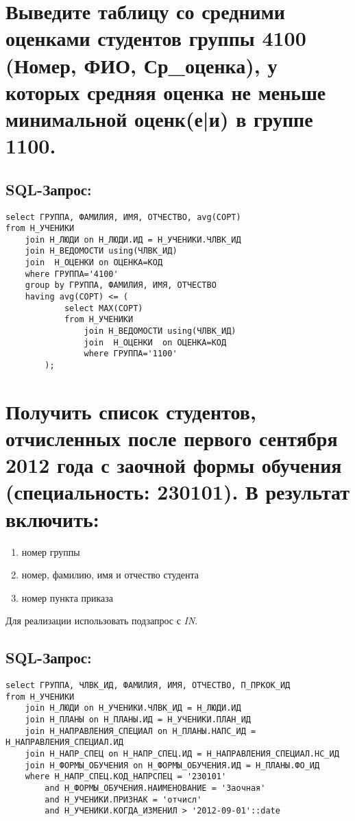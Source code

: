 \newpage
\section{Выведите таблицу со средними оценками студентов группы 4100 (Номер, ФИО, Ср\_оценка), у которых средняя оценка не меньше минимальной оценк(е|и) в группе 1100.}
\subsection{SQL-Запрос:}
\begin{verbatim}
select ГРУППА, ФАМИЛИЯ, ИМЯ, ОТЧЕСТВО, avg(СОРТ)
from Н_УЧЕНИКИ
    join Н_ЛЮДИ on Н_ЛЮДИ.ИД = Н_УЧЕНИКИ.ЧЛВК_ИД
    join Н_ВЕДОМОСТИ using(ЧЛВК_ИД)
    join  Н_ОЦЕНКИ on ОЦЕНКА=КОД
    where ГРУППА='4100'
    group by ГРУППА, ФАМИЛИЯ, ИМЯ, ОТЧЕСТВО
    having avg(СОРТ) <= (
            select MAX(СОРТ)
            from Н_УЧЕНИКИ
                join Н_ВЕДОМОСТИ using(ЧЛВК_ИД)
                join  Н_ОЦЕНКИ  on ОЦЕНКА=КОД
                where ГРУППА='1100'
        );
\end{verbatim}

\newpage
\section{Получить список студентов, отчисленных после первого сентября 2012 года с заочной формы обучения (специальность: 230101). В результат включить:}
\begin{enumerate}
	\item номер группы
	\item номер, фамилию, имя и отчество студента
	\item номер пункта приказа
\end{enumerate}

Для реализации использовать подзапрос с \textit{IN}.

\subsection{SQL-Запрос:}
\begin{verbatim}
select ГРУППА, ЧЛВК_ИД, ФАМИЛИЯ, ИМЯ, ОТЧЕСТВО, П_ПРКОК_ИД
from Н_УЧЕНИКИ
    join Н_ЛЮДИ on Н_УЧЕНИКИ.ЧЛВК_ИД = Н_ЛЮДИ.ИД
    join Н_ПЛАНЫ on Н_ПЛАНЫ.ИД = Н_УЧЕНИКИ.ПЛАН_ИД
    join Н_НАПРАВЛЕНИЯ_СПЕЦИАЛ on Н_ПЛАНЫ.НАПС_ИД = Н_НАПРАВЛЕНИЯ_СПЕЦИАЛ.ИД
    join Н_НАПР_СПЕЦ on Н_НАПР_СПЕЦ.ИД = Н_НАПРАВЛЕНИЯ_СПЕЦИАЛ.НС_ИД
    join Н_ФОРМЫ_ОБУЧЕНИЯ on Н_ФОРМЫ_ОБУЧЕНИЯ.ИД = Н_ПЛАНЫ.ФО_ИД
    where Н_НАПР_СПЕЦ.КОД_НАПРСПЕЦ = '230101'
        and Н_ФОРМЫ_ОБУЧЕНИЯ.НАИМЕНОВАНИЕ = 'Заочная'
        and Н_УЧЕНИКИ.ПРИЗНАК = 'отчисл'
        and Н_УЧЕНИКИ.КОГДА_ИЗМЕНИЛ > '2012-09-01'::date
\end{verbatim}

